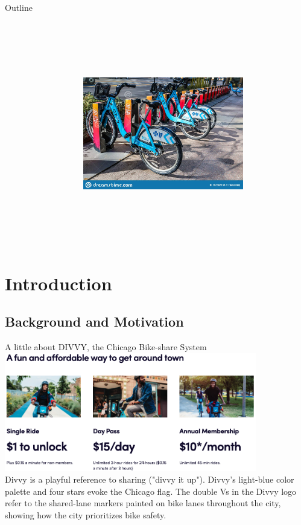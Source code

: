 \documentclass[11pt, xcolor=dvipsnames]{beamer}
\begin{document}
	 \begin{frame}{Outline}
	 		\begin{columns}[T]
	 		\begin{column}{0.5\textwidth}
	 			\vspace{0.3\linewidth}
	 			\tableofcontents
	 		\end{column}
	 		\begin{column}{0.5\textwidth}
	 			\includegraphics[width=7cm, height=9cm]{images/chicago-illinois}
	 		\end{column}
	 	\end{columns}
	 \end{frame}
	\section{Introduction}
		\subsection{Background and Motivation}
	\begin{frame}{A little about DIVVY, the Chicago Bike-share System}
		\centering
		\includegraphics[width=11cm]{images/divvy-about}\\ %
		 Divvy is a playful reference to sharing ("divvy it up"). Divvy’s light-blue color palette and four stars evoke the Chicago flag. The double Vs in the Divvy logo refer to the shared-lane markers painted on bike lanes throughout the city, showing how the city prioritizes bike safety.
	\end{frame}
\end{document}
